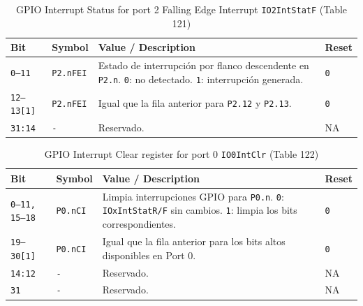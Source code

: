 \begin{table}[H]
  \centering
  \small
  \caption{GPIO Interrupt Status for port 2 Falling Edge Interrupt \texttt{IO2IntStatF} (Table 121)}
  \begin{tabularx}{0.96\textwidth}{|>{\centering\arraybackslash}p{}|>{\raggedright\arraybackslash}p{}|>{\raggedright\arraybackslash}X|>{\centering\arraybackslash}p{}|}
    \hline
    \textbf{Bit} & \textbf{Symbol} & \textbf{Value / Description} & \textbf{Reset} \\
    \hline
    \texttt{0--11} & \texttt{P2.nFEI} & Estado de interrupción por flanco descendente en \texttt{P2.n}. \texttt{0}: no detectado. \texttt{1}: interrupción generada. & \texttt{0} \\
    \hline
    \texttt{12--13[1]} & \texttt{P2.nFEI} & Igual que la fila anterior para \texttt{P2.12} y \texttt{P2.13}. & \texttt{0} \\
    \hline
    \texttt{31:14} & \texttt{-} & Reservado. & NA \\
    \hline
  \end{tabularx}
\end{table}

\begin{table}[H]
  \centering
  \small
  \caption{GPIO Interrupt Clear register for port 0 \texttt{IO0IntClr} (Table 122)}
  \begin{tabularx}{0.96\textwidth}{|>{\centering\arraybackslash}p{}|>{\raggedright\arraybackslash}p{}|>{\raggedright\arraybackslash}X|>{\centering\arraybackslash}p{}|}
    \hline
    \textbf{Bit} & \textbf{Symbol} & \textbf{Value / Description} & \textbf{Reset} \\
    \hline
    \texttt{0--11, 15--18} & \texttt{P0.nCI} & Limpia interrupciones GPIO para \texttt{P0.n}. \texttt{0}: \texttt{IOxIntStatR/F} sin cambios. \texttt{1}: limpia los bits correspondientes. & \texttt{0} \\
    \hline
    \texttt{19--30[1]} & \texttt{P0.nCI} & Igual que la fila anterior para los bits altos disponibles en Port 0. & \texttt{0} \\
    \hline
    \texttt{14:12} & \texttt{-} & Reservado. & NA \\
    \hline
    \texttt{31} & \texttt{-} & Reservado. & NA \\
    \hline
  \end{tabularx}
\end{table}

